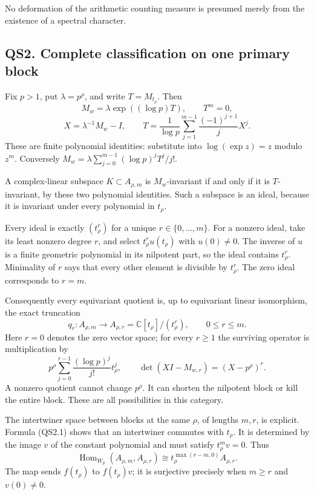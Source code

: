 No deformation of the arithmetic counting measure is presumed merely
from the existence of a spectral character.

\subsection{QS2. Complete classification on one primary
block}\label{qs2.-complete-classification-on-one-primary-block}

Fix \(p>1\), put \(\lambda=p^\rho\), and write \(T=M_{t_\rho}\). Then \[
M_w=\lambda\exp((\log p)T),\qquad T^m=0,
\] \[
X=\lambda^{-1}M_w-I,\qquad
T=\frac1{\log p}\sum_{j=1}^{m-1}\frac{(-1)^{j+1}}jX^j.
\tag{QS2.1}
\] These are finite polynomial identities: substitute into
\(\log(\exp z)=z\) modulo \(z^m\). Conversely
\(M_w=\lambda\sum_{j=0}^{m-1}(\log p)^jT^j/j!\).

A complex-linear subspace \(K\subset A_{\rho,m}\) is \(M_w\)-invariant
if and only if it is \(T\)-invariant, by these two polynomial
identities. Such a subspace is an ideal, because it is invariant under
every polynomial in \(t_\rho\).

Every ideal is exactly \((t_\rho^r)\) for a unique
\(r\in\{0,\ldots,m\}\). For a nonzero ideal, take its least nonzero
degree \(r\), and select \(t_\rho^r u(t_\rho)\) with \(u(0)\ne0\). The
inverse of \(u\) is a finite geometric polynomial in its nilpotent part,
so the ideal contains \(t_\rho^r\). Minimality of \(r\) says that every
other element is divisible by \(t_\rho^r\). The zero ideal corresponds
to \(r=m\).

Consequently every equivariant quotient is, up to equivariant linear
isomorphism, the exact truncation \[
q_r:A_{\rho,m}\longrightarrow A_{\rho,r}
 =\mathbb C[t_\rho]/(t_\rho^r),\qquad 0\le r\le m.
\tag{QS2.2}
\] Here \(r=0\) denotes the zero vector space; for every \(r\ge1\) the
surviving operator is multiplication by \[
p^\rho\sum_{j=0}^{r-1}\frac{(\log p)^j}{j!}t_\rho^j,\qquad
\det(XI-M_{w,r})=(X-p^\rho)^r.
\tag{QS2.3}
\] A nonzero quotient cannot change \(p^\rho\). It can shorten the
nilpotent block or kill the entire block. These are all possibilities in
this category.

The intertwiner space between blocks at the same \(\rho\), of lengths
\(m,r\), is explicit. Formula (QS2.1) shows that an intertwiner commutes
with \(t_\rho\). It is determined by the image \(v\) of the constant
polynomial and must satisfy \(t_\rho^mv=0\). Thus \[
\operatorname{Hom}_{W_p}(A_{\rho,m},A_{\rho,r})
\cong t_\rho^{\max(r-m,0)}A_{\rho,r}.
\tag{QS2.4}
\] The map sends \(f(t_\rho)\) to \(f(t_\rho)v\); it is surjective
precisely when \(m\ge r\) and \(v(0)\ne0\).

